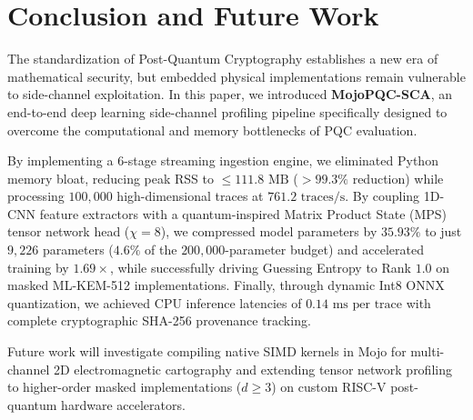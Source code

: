 \documentclass[letterpaper]{article}
\begin{document}
\section{Conclusion and Future Work}
The standardization of Post-Quantum Cryptography establishes a new era of mathematical security, but embedded physical implementations remain vulnerable to side-channel exploitation. In this paper, we introduced \textbf{MojoPQC-SCA}, an end-to-end deep learning side-channel profiling pipeline specifically designed to overcome the computational and memory bottlenecks of PQC evaluation. 

By implementing a 6-stage streaming ingestion engine, we eliminated Python memory bloat, reducing peak RSS to $\le 111.8\text{ MB}$ ($>99.3\%$ reduction) while processing $100,000$ high-dimensional traces at $761.2\text{ traces/s}$. By coupling 1D-CNN feature extractors with a quantum-inspired Matrix Product State (MPS) tensor network head ($\chi=8$), we compressed model parameters by $35.93\%$ to just $9,226$ parameters ($4.6\%$ of the $200,000$-parameter budget) and accelerated training by $1.69\times$, while successfully driving Guessing Entropy to Rank $1.0$ on masked ML-KEM-512 implementations. Finally, through dynamic Int8 ONNX quantization, we achieved CPU inference latencies of $0.14\text{ ms per trace}$ with complete cryptographic SHA-256 provenance tracking.

Future work will investigate compiling native SIMD kernels in Mojo for multi-channel 2D electromagnetic cartography and extending tensor network profiling to higher-order masked implementations ($d \ge 3$) on custom RISC-V post-quantum hardware accelerators.
\end{document}
